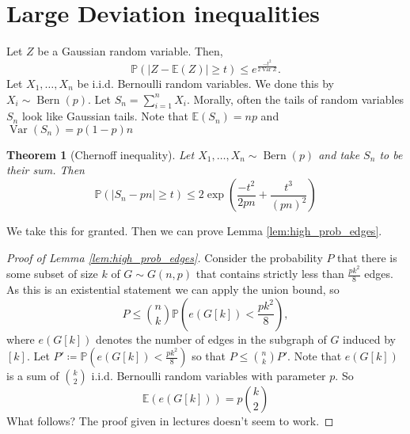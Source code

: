 \documentclass{report}
\DeclareMathOperator{\Var}{Var}
\DeclareMathOperator{\Bern}{Bern}
\theoremstyle{definition}
\theoremstyle{plain}
\newtheorem{thm}{Theorem}
\theoremstyle{definition}
\begin{document}
	\section{Large Deviation inequalities}
	Let $Z$ be a Gaussian random variable. Then,
	\[
		\mathbb{P}(|Z - \mathbb{E}(Z)| \geq t) \leq e^{\frac{-t^2}{2\Var Z}}.
	\]
	Let $X_1,\ldots, X_n$ be i.i.d. Bernoulli random variables. We done this by $X_i\sim \Bern(p)$. Let $S_n = \sum_{i=1}^{n}X_i$. Morally, often the tails of random variables $S_n$ look like Gaussian tails. Note that $\mathbb{E}(S_n) = np$ and $\Var(S_n) = p(1-p)n$
	\begin{thm}[Chernoff inequality]
		Let $X_1,\ldots,X_n \sim \Bern(p)$ and take $S_n$ to be their sum. Then
		\[
			\mathbb{P}(|S_n - pn| \geq t) \leq 2\exp\left(\frac{-t^2}{2pn} + \frac{t^3}{(pn)^2}\right)
		\]
	\end{thm}
	We take this for granted. Then we can prove Lemma \ref{lem:high_prob_edges}.
	\begin{proof}[Proof of Lemma \ref{lem:high_prob_edges}]
		Consider the probability $P$ that there is some subset of size $k$ of $G \sim G(n,p)$ that contains strictly less than $\frac{pk^2}{8}$ edges. As this is an existential statement we can apply the union bound, so
		\[
			P \leq \binom{n}{k}\mathbb{P}\left(e(G[k]) < \frac{pk^2}{8} \right),
		\]
		where $e(G[k])$ denotes the number of edges in the subgraph of $G$ induced by $[k]$. Let $P' \coloneqq \mathbb{P}\left(e(G[k]) < \frac{pk^2}{8} \right)$ so that $P \leq \binom{n}{k}P'$. Note that $e(G[k])$ is a sum of $\binom{k}{2}$ i.i.d. Bernoulli random variables with parameter $p$. So 
		\[
			\mathbb{E}(e(G[k])) = p\binom{k}{2}
		\]
		{\color{red}What follows? The proof given in lectures doesn't seem to work.}
	\end{proof}
\end{document}
